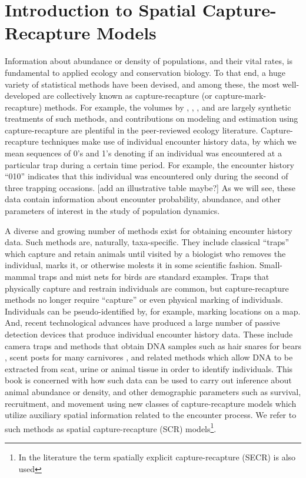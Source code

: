 \chapter{
Introduction to Spatial Capture-Recapture Models
}
\label{chapt.intro}


\vspace{.3in}

Information about abundance or density of populations, and their vital
rates, is fundamental to applied ecology and conservation biology.  To
that end, a huge variety of statistical methods have been devised, and
among these, the most well-developed are collectively known as
capture-recapture (or capture-mark-recapture) methods. For example,
the volumes by \citet{seber:1982}, \citet{borchers_etal:2002},
\citet{williams_etal:2002}, and \citet{amstrup_etal:2005} are largely
synthetic treatments of such methods, and contributions on modeling
and estimation using capture-recapture are plentiful in the
peer-reviewed ecology literature.  Capture-recapture techniques make
use of individual encounter history data, by which we mean sequences
of 0's and 1's denoting if an individual was encountered at a
particular trap during a certain time period. For example, the
encounter history ``010'' indicates that this individual was
encountered only during the second of three trapping occasions. [add
an illustrative table maybe?] As we will see, these data contain
information about encounter probability, abundance, and other
parameters of interest in the study of population dynamics.

A diverse and growing number of methods exist for obtaining encounter
history data. Such methods are, naturally, taxa-specific. They include
classical ``traps'' which capture and retain animals until visited by
a biologist who removes the individual, marks it, or otherwise molests
it in some scientific fashion.  Small-mammal traps and mist nets for
birds are standard examples. Traps that physically capture and
restrain individuals are common, but capture-recapture methods no
longer require ``capture'' or even physical marking of individuals.
Individuals can be pseudo-identified by, for example, marking
locations on a map. And, recent technological advances have produced a
large number of passive detection devices that produce individual
encounter history data. These include camera traps
\citep{karanth_nichols:1998, oconnell_etal:2010} and methods that obtain DNA
samples such as hair snares for bears \citep{gardner_etal:2010}, scent
posts for many carnivores \citep{kery_etal:2010}, and related methods which allow DNA
to be extracted from scat, urine or animal tissue in order to identify
individuals.  This book is concerned with how such data can be used to
carry out inference about animal abundance or density, and other
demographic parameters such as survival, recruitment, and movement
using new classes of capture-recapture models which utilize auxiliary
spatial information related to the encounter process.  We refer to
such methods as spatial capture-recapture (SCR) models\footnote{In
the literature the term spatially explicit capture-recapture (SECR) is
also used}.


